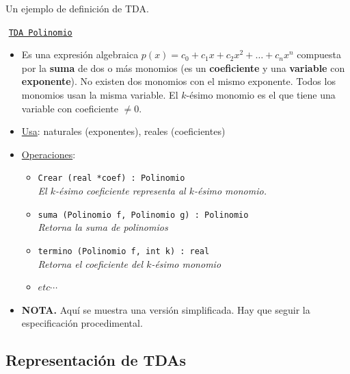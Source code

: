 \documentclass[10pt,envcountsect,spanish]{beamer}
\begin{document}
\begin{frame}{Un ejemplo de definición de TDA.}

$ $\hskip-0.5cm   \unEjemplo \texttt{\underline{TDA Polinomio}}
\begin{itemize} \setlength{\itemsep}{0mm}
\item { Es una expresión algebraica {\footnotesize $p(x)=c_0+c_1x+c_2x^2+\ldots+c_nx^n$ } compuesta por la \textbf{suma} de dos o más monomios (es un \textbf{coeficiente} y una \textbf{variable} con \textbf{exponente}).
No existen dos monomios con el mismo exponente. Todos los monomios usan la misma variable. El $k$-ésimo monomio es el que tiene una variable con coeficiente $\not=0$.
}

\item \underline{Usa}: {  naturales (exponentes), reales (coeficientes)}

\item \underline{Operaciones}:
	\begin{itemize} 
	\item \texttt{Crear (real *coef) : Polinomio} \\
		\textit{ El $k$-ésimo coeficiente representa al $k$-ésimo monomio.}

	\item \texttt{suma (Polinomio f, Polinomio g) : Polinomio}\\
		\textit{ Retorna la suma de polinomios}

	\item \texttt{termino (Polinomio f, int k) : real}\\
		\textit{ Retorna el coeficiente del $k$-ésimo monomio}
		
	\item $etc \cdots$
	\end{itemize}


\item \textbf{NOTA.} Aquí se muestra una versión simplificada. Hay que seguir la especificación procedimental.
\end{itemize}



\end{frame}




\subsection{Representación de TDAs}
\end{document}
